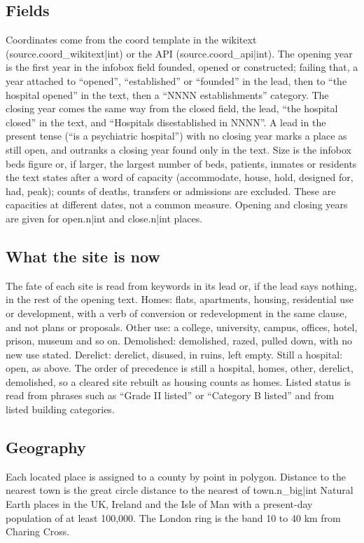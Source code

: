 \documentclass[11pt,a4paper]{article}
\begin{document}
\subsection{Fields}
Coordinates come from the coord template in the wikitext ({{source.coord_wikitext|int}}) or the API ({{source.coord_api|int}}). The opening year is the first year in the infobox field founded, opened or constructed; failing that, a year attached to ``opened'', ``established'' or ``founded'' in the lead, then to ``the hospital opened'' in the text, then a ``NNNN establishments'' category. The closing year comes the same way from the closed field, the lead, ``the hospital closed'' in the text, and ``Hospitals disestablished in NNNN''. A lead in the present tense (``is a psychiatric hospital'') with no closing year marks a place as still open, and outranks a closing year found only in the text. Size is the infobox beds figure or, if larger, the largest number of beds, patients, inmates or residents the text states after a word of capacity (accommodate, house, hold, designed for, had, peak); counts of deaths, transfers or admissions are excluded. These are capacities at different dates, not a common measure. Opening and closing years are given for {{open.n|int}} and {{close.n|int}} places.

\subsection{What the site is now}
The fate of each site is read from keywords in its lead or, if the lead says nothing, in the rest of the opening text. Homes: flats, apartments, housing, residential use or development, with a verb of conversion or redevelopment in the same clause, and not plans or proposals. Other use: a college, university, campus, offices, hotel, prison, museum and so on. Demolished: demolished, razed, pulled down, with no new use stated. Derelict: derelict, disused, in ruins, left empty. Still a hospital: open, as above. The order of precedence is still a hospital, homes, other, derelict, demolished, so a cleared site rebuilt as housing counts as homes. Listed status is read from phrases such as ``Grade II listed'' or ``Category B listed'' and from listed building categories.

\subsection{Geography}
Each located place is assigned to a county by point in polygon. Distance to the nearest town is the great circle distance to the nearest of {{town.n_big|int}} Natural Earth places in the UK, Ireland and the Isle of Man with a present-day population of at least 100,000. The London ring is the band 10 to 40 km from Charing Cross.
\end{document}
